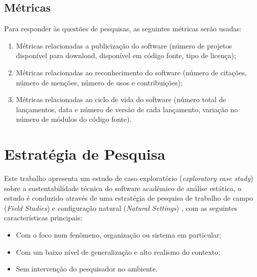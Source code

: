 \subsection{Métricas}

Para responder às questões de pesquisas, as seguintes métricas serão usadas:

\begin{enumerate}
  \item Métricas relacionadas a publicização do software (número de projetos
  disponível para download, disponível em código fonte, tipo de licença);

  \item Métricas relacionadas ao reconhecimento do software (número de
  citações, número de menções, número de usos e contribuições);

  \item Métricas relacionadas ao ciclo de vida do software (número total de
  lançamentos, data e número de versão de cada lançamento, variação no número
  de módulos do código fonte).
\end{enumerate}

\section{Estratégia de Pesquisa}

Este trabalho apresenta um estudo de caso exploratório ({\it exploratory case
study}) sobre a sustentabilidade técnica do software acadêmico de análise
estática, o estudo é conduzido através de uma estratégia de pesquisa de
trabalho de campo ({\it Field Studies}) e configuração natural ({\it Natural
Settings}) \cite{stol2015holistic}, com as seguintes características
principais:

\begin{itemize}
  \item Com o foco num fenômeno, organização ou sistema em particular;
  \item Com um baixo nível de generalização e alto realismo do contexto;
  \item Sem intervenção do pesquisador no ambiente.
\end{itemize}


